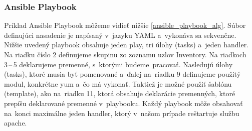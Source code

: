 \subsubsection*{Ansible Playbook}
\label{ansible_playbook}
Príklad Ansible Playbook môžeme vidieť nižšie \ref{ansible_playbook_alg}. Súbor definujúci nasadenie je napísaný v~jazyku YAML a~vykonáva sa sekvenčne. Nižšie uvedený playbook obsahuje jeden play, tri úlohy (tasks) a~jeden handler. Na riadku číslo 2 definujeme skupinu zo zoznamu uzlov Inventory. Na riadkoch 3\,--\,5 deklarujeme premenné, s~ktorými \mbox{budeme pracovať}. \mbox{Nasledujú} úlohy (tasks), ktoré musia byť pomenované a~ďalej na~riadku 9 definujeme použitý modul, konkrétne yum a~čo má vykonať. Taktiež je možné použiť šablónu (template), ako na~riadku 11, ktorá obsahuje deklarácie premenných, ktoré prepíšu deklarované premenné v~playbooku. Každý playbook môže obsahovať na~konci maximálne jeden handler, ktorý v~našom prípade reštartuje službu apache.\\

